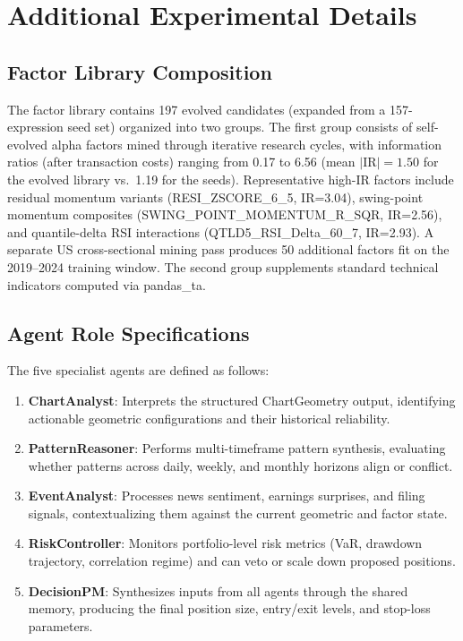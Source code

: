 \section{Additional Experimental Details}
\label{sec:appendix_details}

\subsection{Factor Library Composition}

The factor library contains 197 evolved candidates (expanded from a 157-expression seed set) organized into two groups. The first group consists of self-evolved alpha factors mined through iterative research cycles, with information ratios (after transaction costs) ranging from 0.17 to 6.56 (mean $|\mathrm{IR}|{=}1.50$ for the evolved library vs.\ 1.19 for the seeds). Representative high-IR factors include residual momentum variants (RESI\_ZSCORE\_6\_5, IR=3.04), swing-point momentum composites (SWING\_POINT\_MOMENTUM\_R\_SQR, IR=2.56), and quantile-delta RSI interactions (QTLD5\_RSI\_Delta\_60\_7, IR=2.93). A separate US cross-sectional mining pass produces 50 additional factors fit on the 2019--2024 training window. The second group supplements standard technical indicators computed via pandas\_ta.

\subsection{Agent Role Specifications}

The five specialist agents are defined as follows:
\begin{enumerate}
    \item \textbf{ChartAnalyst}: Interprets the structured ChartGeometry output, identifying actionable geometric configurations and their historical reliability.
    \item \textbf{PatternReasoner}: Performs multi-timeframe pattern synthesis, evaluating whether patterns across daily, weekly, and monthly horizons align or conflict.
    \item \textbf{EventAnalyst}: Processes news sentiment, earnings surprises, and filing signals, contextualizing them against the current geometric and factor state.
    \item \textbf{RiskController}: Monitors portfolio-level risk metrics (VaR, drawdown trajectory, correlation regime) and can veto or scale down proposed positions.
    \item \textbf{DecisionPM}: Synthesizes inputs from all agents through the shared memory, producing the final position size, entry/exit levels, and stop-loss parameters.
\end{enumerate}

